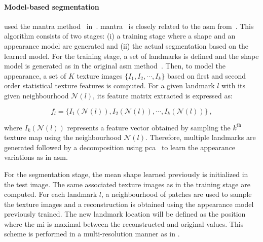 \paragraph{Model-based segmentation} \citeauthor{Viswanath2009} used the \ac{mantra} method~\cite{Toth2008} in~\cite{Viswanath2008a,Viswanath2009}.
\ac{mantra}~\cite{Toth2008} is closely related to the \ac{asm} from~\cite{Cootes1995}.
This algorithm consists of two stages: (i) a training stage where a shape and an appearance model are generated and (ii) the actual segmentation based on the learned model. 
For the training stage, a set of landmarks is defined and the shape model is generated as in the original \ac{asm} method~\cite{Cootes1995}.
Then, to model the appearance, a set of $K$ texture images $\{I_1,I_2,\cdots,I_k\}$ based on first and second order statistical texture features is computed.
For a given landmark $l$ with its given neighbourhood $\mathcal{N}(l)$, its feature matrix extracted is expressed as:

\begin{equation}
  f_l = \{ I_1(\mathcal{N}(l)), I_2(\mathcal{N}(l)), \cdots, I_k(\mathcal{N}(l)) \} \ ,
  \label{eq:mantra1}
\end{equation}

\noindent where $I_k(\mathcal{N}(l))$ represents a feature vector obtained by sampling the $k^{\text{th}}$ texture map using the neighbourhood $\mathcal{N}(l)$.
Therefore, multiple landmarks are generated followed by a decomposition using \ac{pca}~\cite{Pearson1901} to learn the appearance variations as in \ac{asm}.

For the segmentation stage, the mean shape learned previously is initialized in the test image.
The same associated texture images as in the training stage are computed.
For each landmark $l$, a neighbourhood of patches are used to sample the texture images and a reconstruction is obtained using the appearance model previously trained.
The new landmark location will be defined as the position where the \ac{mi} is maximal between the reconstructed and original values.
This scheme is performed in a multi-resolution manner as in \cite{Cootes1995}.

